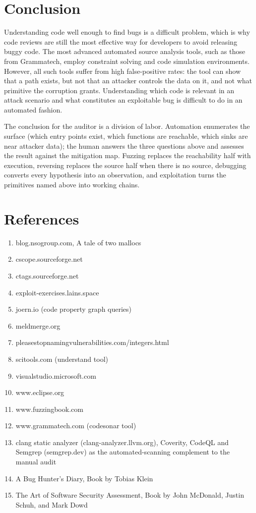 \documentclass[12pt]{Training}
\begin{document}

\section*{Conclusion}
Understanding code well enough to find bugs is a difficult problem, which is why code reviews are still the most effective way for developers to avoid releasing buggy code. The most advanced automated source analysis tools, such as those from Grammatech, employ constraint solving and code simulation environments. However, all such tools suffer from high false-positive rates: the tool can show that a path exists, but not that an attacker controls the data on it, and not what primitive the corruption grants. Understanding which code is relevant in an attack scenario and what constitutes an exploitable bug is difficult to do in an automated fashion.

The conclusion for the auditor is a division of labor. Automation enumerates the surface (which entry points exist, which functions are reachable, which sinks are near attacker data); the human answers the three questions above and assesses the result against the mitigation map. Fuzzing replaces the reachability half with execution, reversing replaces the source half when there is no source, debugging converts every hypothesis into an observation, and exploitation turns the primitives named above into working chains.

\section*{References}
\begin{enumerate}
	\item blog.nsogroup.com, A tale of two mallocs
	\item cscope.sourceforge.net
	\item ctags.sourceforge.net
    \item exploit-exercises.lains.space
	\item joern.io (code property graph queries)
	\item meldmerge.org
	\item pleasestopnamingvulnerabilities.com/integers.html
	\item scitools.com (understand tool)
	\item visualstudio.microsoft.com
	\item www.eclipse.org
	\item www.fuzzingbook.com
	\item www.grammatech.com (codesonar tool)
	\item clang static analyzer (clang-analyzer.llvm.org), Coverity, CodeQL and Semgrep (semgrep.dev) as the automated-scanning complement to the manual audit
	\item A Bug Hunter's Diary, Book by Tobias Klein
	\item The Art of Software Security Assessment, Book by John McDonald, Justin Schuh, and Mark Dowd
\end{enumerate}
\end{document}
